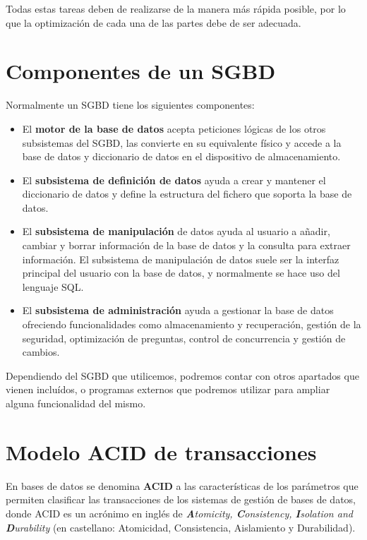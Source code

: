 Todas estas tareas deben de realizarse de la manera más rápida posible, por lo que la optimización de cada una de las partes debe de ser adecuada.


\section{Componentes de un SGBD}
Normalmente un SGBD tiene los siguientes componentes:

\begin{itemize}
    \item El \textbf{motor de la base de datos} acepta peticiones lógicas de los otros subsistemas del SGBD, las convierte en su equivalente físico y accede a la base de datos y diccionario de datos en el dispositivo de almacenamiento.
    \item El \textbf{subsistema de definición de datos} ayuda a crear y mantener el diccionario de datos y define la estructura del fichero que soporta la base de datos.
    \item El \textbf{subsistema de manipulación} de datos ayuda al usuario a añadir, cambiar y borrar información de la base de datos y la consulta para extraer información. El subsistema de manipulación de datos suele ser la interfaz principal del usuario con la base de datos, y normalmente se hace uso del lenguaje SQL.
    \item El \textbf{subsistema de administración} ayuda a gestionar la base de datos ofreciendo funcionalidades como almacenamiento y recuperación, gestión de la seguridad, optimización de preguntas, control de concurrencia y gestión de cambios.
\end{itemize}

Dependiendo del SGBD que utilicemos, podremos contar con otros apartados que vienen incluídos, o programas externos que podremos utilizar para ampliar alguna funcionalidad del mismo.

\section{Modelo ACID de transacciones}
En bases de datos se denomina \textbf{ACID} a las características de los parámetros que permiten clasificar las transacciones de los sistemas de gestión de bases de datos, donde ACID es un acrónimo en inglés de \textit{\textbf{A}tomicity, \textbf{C}onsistency, \textbf{I}solation and \textbf{D}urability} (en castellano: Atomicidad, Consistencia, Aislamiento y Durabilidad).

